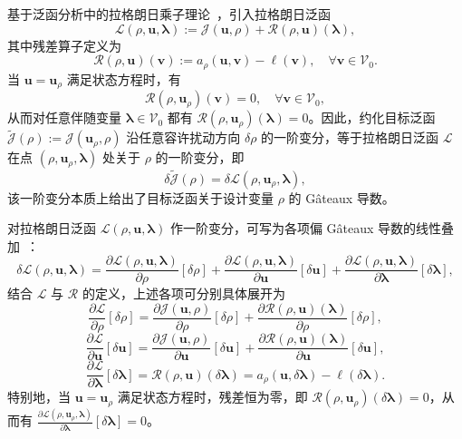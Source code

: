 基于泛函分析中的拉格朗日乘子理论~\cite{luenbergerOptimizationVectorSpace1969}，引入拉格朗日泛函
\[
\mathcal{L}(\rho,\boldsymbol{u},\boldsymbol{\lambda}) := \mathcal{J}(\boldsymbol{u}, \rho) + \mathcal{R}(\rho,\boldsymbol{u})(\boldsymbol\lambda),
\]
其中残差算子定义为
\begin{equation}
	\mathcal{R}(\rho,\boldsymbol{u})(\boldsymbol{v}) := a_\rho(\boldsymbol{u},\boldsymbol{v}) - \ell(\boldsymbol{v}),\quad\forall\boldsymbol{v}\in\mathcal{V}_0.
	\label{eq:ch2_residual_operator}
\end{equation}
当 $\boldsymbol{u}=\boldsymbol{u}_\rho$ 满足状态方程时，有
\[
\mathcal{R}(\rho,\boldsymbol{u}_\rho)(\boldsymbol{v}) = 0,\quad\forall\boldsymbol{v}\in\mathcal{V}_0,
\]
从而对任意伴随变量 $\boldsymbol{\lambda}\in\mathcal{V}_0$ 都有 $\mathcal{R}(\rho,\boldsymbol{u}_\rho)(\boldsymbol{\lambda}) = 0$。因此，约化目标泛函 $\tilde{\mathcal{J}}(\rho) := \mathcal{J}(\boldsymbol{u}_\rho, \rho)$ 沿任意容许扰动方向 $\delta\rho$ 的一阶变分，等于拉格朗日泛函 $\mathcal{L}$ 在点 $(\rho,\boldsymbol{u}_\rho,\boldsymbol{\lambda})$ 处关于 $\rho$ 的一阶变分，即
\[
\delta\tilde{\mathcal{J}}(\rho) = \delta\mathcal{L}(\rho,\boldsymbol{u}_\rho,\boldsymbol{\lambda}),
\]
该一阶变分本质上给出了目标泛函关于设计变量 $\rho$ 的 Gâteaux 导数。

对拉格朗日泛函 $\mathcal{L}(\rho,\boldsymbol{u},\boldsymbol{\lambda})$ 作一阶变分，可写为各项偏 Gâteaux 导数的线性叠加~\cite{luenbergerOptimizationVectorSpace1969}：
\[
\delta\mathcal{L}(\rho,\boldsymbol{u},\boldsymbol{\lambda}) = \frac{\partial\mathcal{L}(\rho,\boldsymbol{u},\boldsymbol{\lambda})}{\partial\rho}[\delta\rho] + \frac{\partial\mathcal{L}(\rho,\boldsymbol{u},\boldsymbol{\lambda})}{\partial\boldsymbol{u}}[\delta\boldsymbol{u}] + \frac{\partial\mathcal{L}(\rho,\boldsymbol{u},\boldsymbol{\lambda})}{\partial\boldsymbol\lambda}[\delta\boldsymbol\lambda],
\]
结合 $\mathcal{L}$ 与 $\mathcal{R}$ 的定义，上述各项可分别具体展开为
\[
\frac{\partial\mathcal{L}}{\partial\rho}[\delta\rho] = \frac{\partial\mathcal{J}( \boldsymbol{u},\rho)}{\partial\rho}[\delta\rho] + \frac{\partial\mathcal{R}(\rho,\boldsymbol{u})(\boldsymbol\lambda)}{\partial\rho}[\delta\rho],
\]
\[
\frac{\partial\mathcal{L}}{\partial\boldsymbol{u}}[\delta\boldsymbol{u}] = \frac{\partial\mathcal{J}( \boldsymbol{u},\rho)}{\partial\boldsymbol{u}}[\delta\boldsymbol{u}] + \frac{\partial\mathcal{R}(\rho,\boldsymbol{u})(\boldsymbol\lambda)}{\partial\boldsymbol{u}}[\delta\boldsymbol{u}],
\]
\[
\frac{\partial\mathcal{L}}{\partial\boldsymbol\lambda}[\delta\boldsymbol\lambda] = \mathcal{R}(\rho,\boldsymbol{u})(\delta\boldsymbol{\lambda}) = a_\rho(\boldsymbol{u},\delta\boldsymbol\lambda) - \ell(\delta\boldsymbol\lambda).
\]
特别地，当 $\boldsymbol{u}=\boldsymbol{u}_\rho$ 满足状态方程时，残差恒为零，即 $\mathcal{R}(\rho,\boldsymbol{u}_\rho)(\delta\boldsymbol{\lambda})=0$，从而有 $\frac{\partial\mathcal{L}(\rho,\boldsymbol{u}_\rho,\boldsymbol{\lambda})}{\partial\boldsymbol\lambda}[\delta\boldsymbol\lambda] = 0$。


